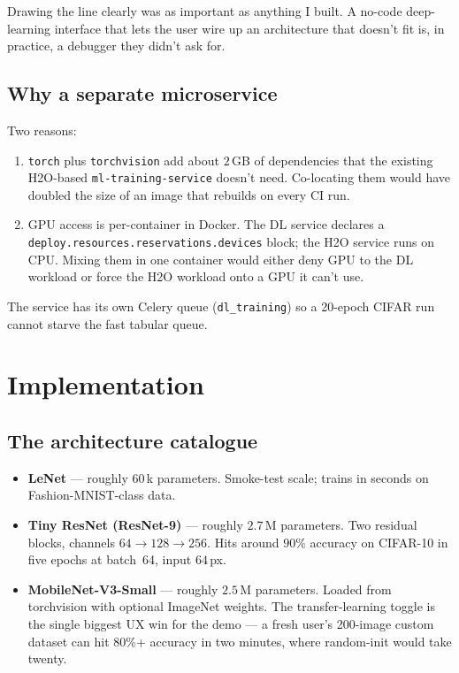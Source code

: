 \documentclass[12pt, a4paper]{report}
\begin{document}
Drawing the line clearly was as important as anything I built. A
no-code deep-learning interface that lets the user wire up an
architecture that doesn't fit is, in practice, a debugger they
didn't ask for.

\subsection{Why a separate microservice}

Two reasons:

\begin{enumerate}
    \item \texttt{torch} plus \texttt{torchvision} add about
        $2$\,GB of dependencies that the existing H2O-based
        \texttt{ml-training-service} doesn't need. Co-locating them
        would have doubled the size of an image that rebuilds on
        every CI run.
    \item GPU access is per-container in Docker. The DL service
        declares a \texttt{deploy.resources.reservations.devices}
        block; the H2O service runs on CPU. Mixing them in one
        container would either deny GPU to the DL workload or
        force the H2O workload onto a GPU it can't use.
\end{enumerate}

The service has its own Celery queue (\texttt{dl\_training}) so a
20-epoch CIFAR run cannot starve the fast tabular queue.

\section{Implementation}

\subsection{The architecture catalogue}

\begin{itemize}
    \item \textbf{LeNet} --- roughly $60$\,k parameters. Smoke-test
        scale; trains in seconds on Fashion-MNIST-class data.
    \item \textbf{Tiny ResNet (ResNet-9)} --- roughly $2.7$\,M
        parameters. Two residual blocks, channels
        $64\to128\to256$. Hits around $90\%$ accuracy on CIFAR-10
        in five epochs at batch~64, input $64$\,px.
    \item \textbf{MobileNet-V3-Small} --- roughly $2.5$\,M
        parameters. Loaded from torchvision with optional
        ImageNet weights. The transfer-learning toggle is the
        single biggest UX win for the demo --- a fresh user's
        200-image custom dataset can hit 80\%+ accuracy in two
        minutes, where random-init would take twenty.
\end{itemize}
\end{document}
